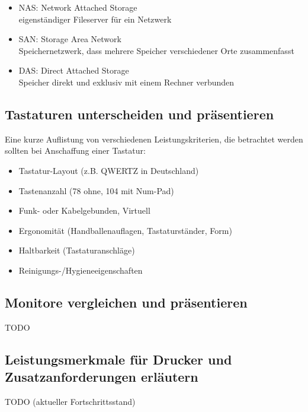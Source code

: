     \begin{tcolorbox}[width=15cm, center, title=NAS SAN und DAS, coltitle=white, colframe=orange, colback=white!60!orange]
        \begin{itemize}[itemsep=0.1em, parsep=0.3em]
            \item NAS\@: Network Attached Storage \\ eigenständiger Fileserver für ein Netzwerk
            \item SAN\@: Storage Area Network \\ Speichernetzwerk, dass mehrere Speicher verschiedener Orte zusammenfasst
            \item DAS\@: Direct Attached Storage \\ Speicher direkt und exklusiv mit einem Rechner verbunden
        \end{itemize}
    \end{tcolorbox}

\subsection{Tastaturen unterscheiden und präsentieren}
    \begin{subindent}
        Eine kurze Auflistung von verschiedenen Leistungskriterien, die betrachtet werden sollten bei Anschaffung einer Tastatur:
    \end{subindent}

    \begin{itemize}[leftmargin=2.5cm, topsep=0.2em, itemsep=0.1em, parsep=0.3em]
        \item Tastatur-Layout (z.B. QWERTZ in Deutschland)
        \item Tastenanzahl (78 ohne, 104 mit Num-Pad)
        \item Funk- oder Kabelgebunden, Virtuell
        \item Ergonomität (Handballenauflagen, Tastaturständer, Form)
        \item Haltbarkeit (Tastaturanschläge)
        \item Reinigungs-/Hygieneeigenschaften
    \end{itemize}

\subsection{Monitore vergleichen und präsentieren}
    TODO
\subsection{Leistungsmerkmale für Drucker und Zusatzanforderungen erläutern}
    TODO (aktueller Fortschrittsstand)
